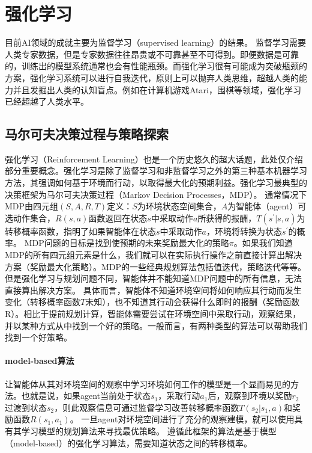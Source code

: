 \section{强化学习}
目前AI领域的成就主要为监督学习（supervised learning）的结果\cite{hastie2009elements,NIPS2012_4824,lecun2015deep,resnet}。
监督学习需要人类专家数据，但是专家数据往往昂贵或不可靠甚至不可得到。即便数据是可靠的，训练出的模型系统通常也会有性能瓶颈。而强化学习很有可能成为突破瓶颈的方案，强化学习系统可以进行自我迭代，原则上可以抛弃人类思维，超越人类的能力并且发掘出人类的认知盲点。例如在计算机游戏Atari，围棋等领域，强化学习已经超越了人类水平\cite{Silver2016}。
\subsection{马尔可夫决策过程与策略探索}
强化学习（Reinforcement Learning）也是一个历史悠久的超大话题，此处仅介绍部分重要概念。强化学习是除了监督学习和非监督学习之外的第三种基本机器学习方法，其强调如何基于环境而行动，以取得最大化的预期利益\cite{Sutton1998}。强化学习最典型的决策框架为马尔可夫决策过程（Markov Decision Processes，MDP）\cite{Bel}。
通常情况下MDP由四元组$(S,A,R,T)$定义：$S$为环境状态空间集合，$A$为智能体（agent）可选动作集合，$R(s,a)$函数返回在状态$s$中采取动作$a$所获得的报酬，$T(s^{'}|s,a)$为转移概率函数，指明了如果智能体在状态$s$中采取动作$a$，环境将转换为状态$s^{'}$的概率。
MDP问题的目标是找到使预期的未来奖励最大化的策略$\pi$。如果我们知道MDP的所有四元组元素是什么，我们就可以在实际执行操作之前直接计算出解决方案（奖励最大化策略）。MDP的一些经典规划算法包括值迭代，策略迭代等等\cite{Sutton1998}。但是强化学习与规划问题不同，智能体并不能知道MDP问题中的所有信息，无法直接算出解决方案。
具体而言，智能体不知道环境空间将如何响应其行动而发生变化（转移概率函数$T$未知），也不知道其行动会获得什么即时的报酬（奖励函数R）。相比于提前规划计算，智能体需要尝试在环境空间中采取行动，观察结果，并以某种方式从中找到一个好的策略。一般而言，有两种类型的算法可以帮助我们找到一个好策略\cite{rlbase}。

\paragraph{model-based算法}
让智能体从其对环境空间的观察中学习环境如何工作的模型是一个显而易见的方法。也就是说，如果agent当前处于状态$s_{1}$，采取行动$a_{1}$后，观察到环境以奖励$r_{2}$过渡到状态$s_{2}$，则此观察信息可通过监督学习改善转移概率函数$T(s_{2}|s_{1},a)$和奖励函数$R(s_{1},a_{1})$。
一旦agent对环境空间进行了充分的观察建模，就可以使用具有其学习模型的规划算法来寻找最优策略。 遵循此框架的算法是基于模型（model-based）的强化学习算法，需要知道状态之间的转移概率\cite{moerland2021modelbased,606886,10.1162/089976602753712972}。
